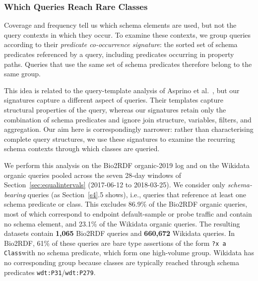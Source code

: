 \documentclass[sw]{iosart2x}
\providecommand{\DIFaddbegin}{} %
\providecommand{\DIFaddend}{} %
\providecommand{\DIFdelbegin}{} %
\providecommand{\DIFdelend}{} %
\providecommand{\DIFscaledelfig}{0.5}
\newlength{\DIFdelgraphicswidth} %
\newlength{\DIFdelgraphicsheight} %
\providecommand{\DIFaddincludegraphics}[2][]{{\color{blue}\fbox{\DIFOincludegraphics[#1]{#2}}}} %
\providecommand{\DIFdelincludegraphics}[2][]{%
\sbox{\DIFdelgraphicsbox}{\DIFOincludegraphics[#1]{#2}}%
\settoboxwidth{\DIFdelgraphicswidth}{\DIFdelgraphicsbox} %
\settoboxtotalheight{\DIFdelgraphicsheight}{\DIFdelgraphicsbox} %
\scalebox{\DIFscaledelfig}{%
\parbox[b]{\DIFdelgraphicswidth}{\usebox{\DIFdelgraphicsbox}\\[-\baselineskip] \rule{\DIFdelgraphicswidth}{0em}}\llap{\resizebox{\DIFdelgraphicswidth}{\DIFdelgraphicsheight}{%
\setlength{\unitlength}{\DIFdelgraphicswidth}%
\begin{picture}(1,1)%
\thicklines\linethickness{2pt} %
{\color[rgb]{1,0,0}\put(0,0){\framebox(1,1){}}}%
{\color[rgb]{1,0,0}\put(0,0){\line( 1,1){1}}}%
{\color[rgb]{1,0,0}\put(0,1){\line(1,-1){1}}}%
\end{picture}%
}\hspace*{3pt}}} %
} %
\DeclareRobustCommand{\DIFaddbegin}{\DIFOaddbegin \let\includegraphics\DIFaddincludegraphics} %
\DeclareRobustCommand{\DIFaddend}{\DIFOaddend \let\includegraphics\DIFOincludegraphics} %
\DeclareRobustCommand{\DIFdelbegin}{\DIFOdelbegin \let\includegraphics\DIFdelincludegraphics} %
\DeclareRobustCommand{\DIFdelend}{\DIFOaddend \let\includegraphics\DIFOincludegraphics} %
\begin{document}
\subsubsection{Which Queries Reach Rare Classes}\DIFdelbegin %
\DIFdelend \DIFaddbegin \label{sec:templates}
\DIFaddend Coverage and frequency tell us which schema elements are used, but not the query contexts in which they occur. To examine these contexts, we group queries according to their \emph{predicate co-occurrence signature}: the sorted set of schema predicates referenced by a query, including predicates occurring in property paths. Queries that use the same set of schema predicates therefore belong to the same group.


This idea is related to the query-template analysis of Asprino et al.~\cite{asprino2023your}, but our signatures capture a different aspect of queries. Their templates capture structural properties of the query, whereas our signatures retain only the combination of schema predicates and ignore join structure, variables, filters, and aggregation. Our aim here is correspondingly narrower: rather than characterising complete query structures, we use these signatures to examine the recurring schema contexts through which classes are queried.


We perform this analysis on the Bio2RDF organic-2019 log and on the Wikidata organic queries pooled across the seven 28-day windows of Section~\ref{sec:equalintervals} (2017-06-12 to 2018-03-25). We consider only \emph{schema-bearing} queries (as Section~\ref{s4}.5 shows), i.e., queries that reference at least one schema predicate or class. This excludes 86.9\% of the Bio2RDF organic queries, most of which correspond to endpoint default-sample or probe traffic and contain no schema element, and 23.1\% of the Wikidata organic queries. The resulting datasets contain \textbf{1{,}065} Bio2RDF queries and \textbf{660{,}672} Wikidata queries. In Bio2RDF, 61\% of these queries are bare type assertions of the form \texttt{?x a Class}with no schema predicate, which form one high-volume group. Wikidata has no corresponding group because classes are typically reached through schema predicates \texttt{wdt:P31}/\texttt{wdt:P279}.
\end{document}
